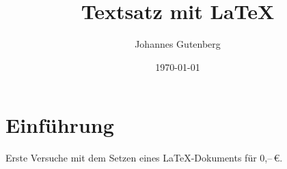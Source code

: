 \documentclass[a5paper, ngerman, 11pt]{article}
\title{Textsatz mit \LaTeX}
\author{Johannes Gutenberg}
\date{\today}
\begin{document}
\maketitle
\section{Einführung}
Erste Versuche mit dem Setzen eines \LaTeX-Dokuments für 0,--\,\euro.
\blindtext[2]
\end{document}
